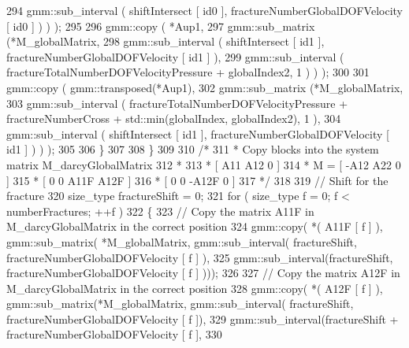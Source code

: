 \begin{DoxyCode}
294                                         gmm::sub\_interval ( shiftIntersect [ id0 ], 
      fractureNumberGlobalDOFVelocity [ id0 ] ) ) );
295 
296             gmm::copy ( *Aup1, 
297                         gmm::sub\_matrix (*M\_globalMatrix,
298                                         gmm::sub\_interval ( shiftIntersect [ id1 ], 
      fractureNumberGlobalDOFVelocity [ id1 ] ),
299                                         gmm::sub\_interval (  fractureTotalNumberDOFVelocityPressure + 
      globalIndex2, 1 ) ) );
300 
301             gmm::copy ( gmm::transposed(*Aup1), 
302                         gmm::sub\_matrix (*M\_globalMatrix,
303                                         gmm::sub\_interval (  fractureTotalNumberDOFVelocityPressure + 
      fractureNumberCross + std::min(globalIndex, globalIndex2), 1 ),
304                                         gmm::sub\_interval ( shiftIntersect [ id1 ], 
      fractureNumberGlobalDOFVelocity [ id1 ] ) ) );
305 
306          \}
307         
308     \}
309     
310     \textcolor{comment}{/*}
311 \textcolor{comment}{    *       Copy blocks into the system matrix M\_darcyGlobalMatrix}
312 \textcolor{comment}{    *       }
313 \textcolor{comment}{    *               [  A11  A12  0          ]}
314 \textcolor{comment}{    *           M = [ -A12  A22  0          ]}
315 \textcolor{comment}{    *               [  0    0    A11F  A12F ]}
316 \textcolor{comment}{    *               [  0    0   -A12F  0    ]       }
317 \textcolor{comment}{    */} 
318 
319     \textcolor{comment}{// Shift for the fracture}
320     size\_type fractureShift = 0;
321     \textcolor{keywordflow}{for} ( size\_type f = 0; f < numberFractures; ++f )
322     \{
323        \textcolor{comment}{// Copy the matrix A11F in M\_darcyGlobalMatrix in the correct position}
324        gmm::copy( *( A11F [ f ] ), gmm::sub\_matrix( *M\_globalMatrix, gmm::sub\_interval( fractureShift, 
      fractureNumberGlobalDOFVelocity [ f ] ),
325                                                                  gmm::sub\_interval(fractureShift, 
      fractureNumberGlobalDOFVelocity [ f ] )));
326 
327        \textcolor{comment}{// Copy the matrix A12F in M\_darcyGlobalMatrix in the correct position}
328        gmm::copy( *( A12F [ f ] ), gmm::sub\_matrix(*M\_globalMatrix, gmm::sub\_interval( fractureShift, 
      fractureNumberGlobalDOFVelocity [ f ]),
329                                                               gmm::sub\_interval(fractureShift + 
      fractureNumberGlobalDOFVelocity [ f ], 
330                                                                                 

\end{DoxyCode}
